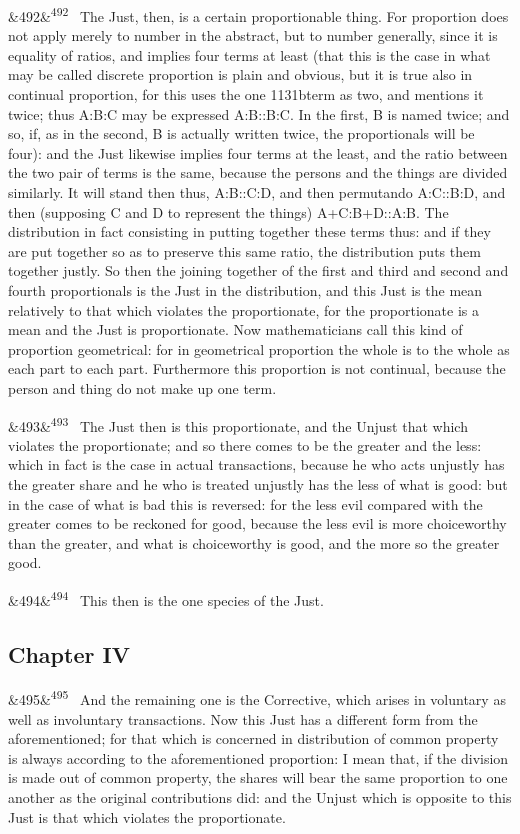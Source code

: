 \documentclass[12pt]{article}
\newcommand{\para}[1][]{\par\noindent\ifx&#1&\else\textsuperscript{\footnotesize #1}~\fi}
\begin{document}
\para[492] The Just, then, is a certain proportionable thing. For proportion does not apply merely to number in the abstract, but to number generally, since it is equality of ratios, and implies four terms at least (that this is the case in what may be called discrete proportion is plain and obvious, but it is true also in continual proportion, for this uses the one 1131bterm as two, and mentions it twice; thus A:B:C may be expressed A:B::B:C. In the first, B is named twice; and so, if, as in the second, B is actually written twice, the proportionals will be four): and the Just likewise implies four terms at the least, and the ratio between the two pair of terms is the same, because the persons and the things are divided similarly. It will stand then thus, A:B::C:D, and then permutando A:C::B:D, and then (supposing C and D to represent the things) A+C:B+D::A:B. The distribution in fact consisting in putting together these terms thus: and if they are put together so as to preserve this same ratio, the distribution puts them together justly. So then the joining together of the first and third and second and fourth proportionals is the Just in the distribution, and this Just is the mean relatively to that which violates the proportionate, for the proportionate is a mean and the Just is proportionate. Now mathematicians call this kind of proportion geometrical: for in geometrical proportion the whole is to the whole as each part to each part. Furthermore this proportion is not continual, because the person and thing do not make up one term.

\para[493] The Just then is this proportionate, and the Unjust that which violates the proportionate; and so there comes to be the greater and the less: which in fact is the case in actual transactions, because he who acts unjustly has the greater share and he who is treated unjustly has the less of what is good: but in the case of what is bad this is reversed: for the less evil compared with the greater comes to be reckoned for good, because the less evil is more choiceworthy than the greater, and what is choiceworthy is good, and the more so the greater good.

\para[494] This then is the one species of the Just.

\subsection*{Chapter IV}

\para[495] And the remaining one is the Corrective, which arises in voluntary as well as involuntary transactions. Now this Just has a different form from the aforementioned; for that which is concerned in distribution of common property is always according to the aforementioned proportion: I mean that, if the division is made out of common property, the shares will bear the same proportion to one another as the original contributions did: and the Unjust which is opposite to this Just is that which violates the proportionate.
\end{document}
